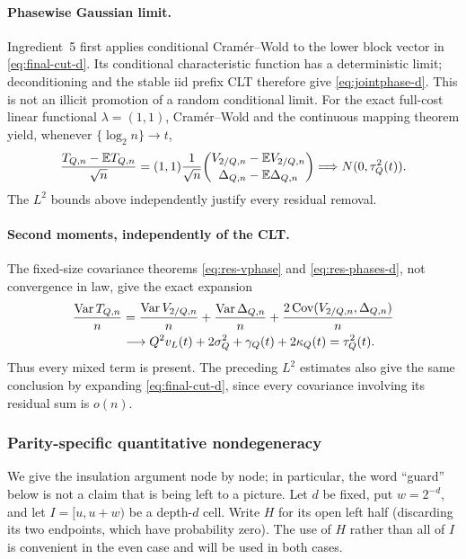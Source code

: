 \documentclass[11pt]{article}
\numberwithin{equation}{section}
\newcommand{\E}{\mathbb E}\newcommand{\Pp}{\mathbb P}
\newcommand{\Var}{\operatorname{Var}}\newcommand{\Cov}{\operatorname{Cov}}
\newcommand{\1}{\mathbf 1}\newcommand{\F}{\mathcal F}\newcommand{\D}{\mathcal D}
\begin{document}
\paragraph{Phasewise Gaussian limit.}
Ingredient~5 first applies conditional Cram\'er--Wold to the lower block
vector in \eqref{eq:final-cut-d}.  Its conditional characteristic function
has a deterministic limit; deconditioning and the stable iid prefix CLT
therefore give \eqref{eq:jointphase-d}.  This is not an illicit promotion of
a random conditional limit.  For the exact full-cost linear functional
$\lambda=(1,1)$, Cram\'er--Wold and the continuous mapping theorem yield,
whenever $\{\log_2n\}\to t$,
\begin{equation}
 {T_{Q,n}-\E T_{Q,n}\over\sqrt n}
 =(1,1){1\over\sqrt n}
 \binom{V_{2/Q,n}-\E V_{2/Q,n}}
       {\Delta_{Q,n}-\E\Delta_{Q,n}}
 \Longrightarrow N(0,\tau_Q^2(t)).                    \label{eq:final-phase-clt-d}
\end{equation}
The $L^2$ bounds above independently justify every residual removal.

\paragraph{Second moments, independently of the CLT.}
The fixed-size covariance theorems \eqref{eq:res-vphase} and
\eqref{eq:res-phases-d}, not convergence in law, give the exact expansion
\begin{align}
 {\Var T_{Q,n}\over n}
 &={\Var V_{2/Q,n}\over n}+{\Var\Delta_{Q,n}\over n}
       +{2\Cov(V_{2/Q,n},\Delta_{Q,n})\over n}\\
 &\longrightarrow Q^2v_L(t)+2\sigma_Q^2+\gamma_Q(t)+2\kappa_Q(t)
 =\tau_Q^2(t).                                         \label{eq:final-var-d}
\end{align}
Thus every mixed term is present.  The preceding $L^2$ estimates also give the
same conclusion by expanding \eqref{eq:final-cut-d}, since every covariance
involving its residual sum is $o(n)$.

\subsubsection{Parity-specific quantitative nondegeneracy}
We give the insulation argument node by node; in particular, the word
``guard'' below is not a claim that is being left to a picture.  Let $d$ be
fixed, put $w=2^{-d}$, and let $I=[u,u+w)$ be a depth-$d$ cell.  Write
$H$ for its open left half (discarding its two endpoints, which have
probability zero).  The use of $H$ rather than all of $I$ is convenient in
the even case and will be used in both cases.
\end{document}
